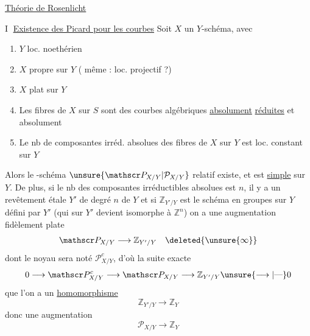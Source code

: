 \uline{Théorie de Rosenlicht}

\textcircled{I} \uline{Existence des Picard pour les courbes}
Soit $X$ un $Y$-schéma, avec

\begin{enumerate}[label=\alph*)]
\item $Y$ loc. noethérien
\item $X$ propre sur $Y$ ({} même : loc. projectif ?)
\item $X$ plat sur $Y$
\item Les fibres de $X$ sur $S$ sont des courbes algébriques \uline{absolument}   \uline{réduites} et absolument  
\item Le nb de composantes  irréd. absolues des fibres de $X$ sur $Y$ est loc. constant sur $Y$
\end{enumerate}
Alors le {}-schéma ${\unsure{\mathscr P_{X/Y}|\mathcal P_{X/Y}}}$ relatif existe, et est \uline{simple} sur $Y$.
De plus, si le nb des composantes irréductibles absolues est $n$, il y a un revêtement  étale $Y'$ de degré $n$ de $Y$ et si $\mathbb Z_{Y'/Y}$ est le schéma en groupes  sur $Y$ défini par $Y'$ (qui sur $Y'$ devient isomorphe à $\mathbb Z^n$) on a une augmentation  fidèlement plate
\[
\mathscr P_{X/Y}\longrightarrow\mathbb Z_{Y'/Y}\quad\deleted{{\unsure{\infty}}}
\]
dont le noyau sera noté $\mathscr P_{X/Y}^c$, d'où la suite exacte
\[
0\longrightarrow\mathscr P_{X/Y}^c\longrightarrow\mathscr P_{X/Y}\longrightarrow\mathbb Z_{Y'/Y}{\unsure{\longrightarrow|\text{---}}}0
\]
{} que l'on a un \uline{homomorphisme {}}
\[
\mathbb Z_{Y'/Y}\longrightarrow\mathbb Z_Y
\]
donc une augmentation
\[
\mathscr P_{X/Y}\longrightarrow\mathbb Z_Y
\]

